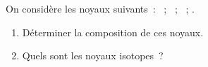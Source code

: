 On considère les noyaux suivants~:
~; ~; ~; .
\begin{enumerate}
    \item Déterminer la composition de ces noyaux.
    \item Quels sont les noyaux isotopes~?
\end{enumerate}
